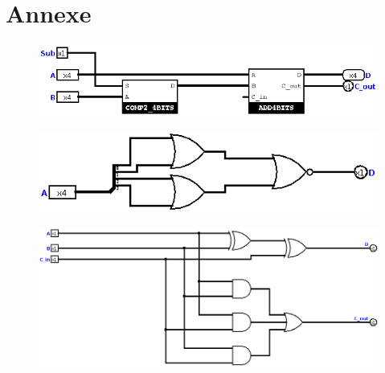\documentclass[a4paper]{article}
\begin{document}
\newpage

\section{Annexe}

\begin{figure}[H]
    \centering
    \includegraphics[width=\textwidth]{src/ADDSUB_4BITS.png}
    \label{fig:ISZERO}
\end{figure}

\begin{figure}[H]
    \centering
    \includegraphics[width=\textwidth]{src/ISZERO_4BITS.png}
    \label{fig:ISZERO}
\end{figure}


\begin{figure}[H]
     \centering
    \includegraphics[width=\textwidth]{src/ADD_1BIT.png}
    \label{fig:ADD_1BIT}
\end{figure}
\end{document}
